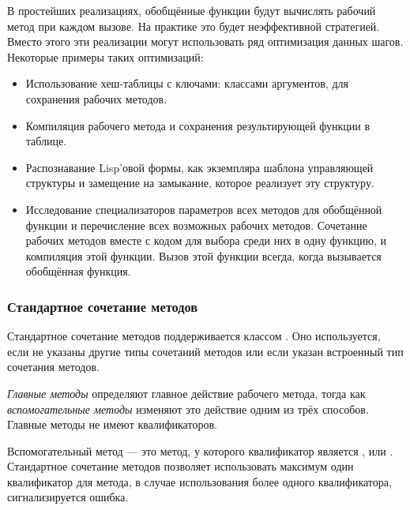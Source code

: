 \beforenoterule
\begin{implementation}

В простейших реализациях, обобщённые функции будут вычислять рабочий метод при
каждом вызове. На практике это будет неэффективной стратегией. Вместо этого эти
реализации могут использовать ряд оптимизация данных шагов. Некоторые примеры
таких оптимизаций:

\begin{itemize}

\item Использование хеш-таблицы с ключами: классами аргументов, для сохранения
  рабочих методов.

\item Компиляция рабочего метода и сохранения результирующей функции в таблице.

\item Распознавание Lisp'овой формы, как экземпляра шаблона управляющей
  структуры и замещение на замыкание, которое реализует эту структуру.

\item Исследование специализаторов параметров всех методов для обобщённой
  функции и перечисление всех возможных рабочих методов. Сочетание рабочих
  методов вместе с кодом для выбора среди них в одну функцию, и компиляция этой
  функции. Вызов этой функции всегда, когда вызывается обобщённая функция.
\end{itemize}
\end{implementation}
\afternoterule

\subsubsection{Стандартное сочетание методов}
\label{Standard-Method-Combination-SECTION}

Стандартное сочетание методов поддерживается классом
.
Оно используется, если не указаны другие типы сочетаний методов или если
указан встроенный  тип сочетания методов.

\emph{Главные методы} определяют главное действие рабочего метода, тогда как
\emph{вспомогательные методы} изменяют это действие одним из трёх способов. 
Главные методы не имеют квалификаторов.

Вспомогательный метод --- это метод, у которого квалификатор является
,  или . Стандартное сочетание методов
позволяет использовать максимум один квалификатор для метода, в случае
использования более одного квалификатора, сигнализируется ошибка.

